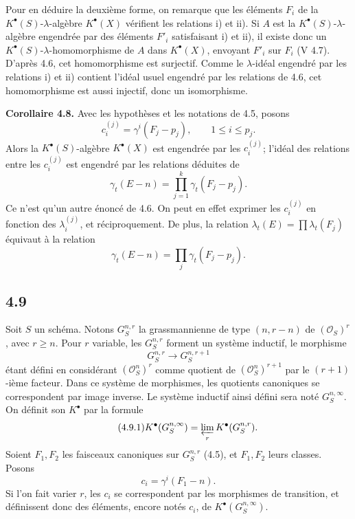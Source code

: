 \documentclass[11pt]{article}
\begin{document}
Pour en déduire la deuxième forme, on remarque que les éléments \(F_i\) de la \(K^\bullet(S)\)-\(\lambda\)-algèbre \(K^\bullet(X)\) vérifient les relations i) et ii). Si \(A\) est la \(K^\bullet(S)\)-\(\lambda\)-algèbre engendrée par des éléments \(F'_i\) satisfaisant i) et ii), il existe donc un \(K^\bullet(S)\)-\(\lambda\)-homomorphisme de \(A\) dans \(K^\bullet(X)\), envoyant \(F'_i\) sur \(F_i\) (V 4.7). D'après 4.6, cet homomorphisme est surjectif. Comme le \(\lambda\)-idéal engendré par les relations i) et ii) contient l'idéal usuel engendré par les relations de 4.6, cet homomorphisme est aussi injectif, donc un isomorphisme.

\textbf{Corollaire 4.8.} Avec les hypothèses et les notations de 4.5, posons
\[
  c_i^{(j)}=\gamma^i(F_j-p_j),\qquad 1\leq i\leq p_j.
\]
Alors la \(K^\bullet(S)\)-algèbre \(K^\bullet(X)\) est engendrée par les \(c_i^{(j)}\); l'idéal des relations entre les \(c_i^{(j)}\) est engendré par les relations déduites de
\[
  \gamma_t(E-n)=\prod_{j=1}^{k}\gamma_t(F_j-p_j).
\]
Ce n'est qu'un autre énoncé de 4.6. On peut en effet exprimer les \(c_i^{(j)}\) en fonction des \(\lambda_i^{(j)}\), et réciproquement. De plus, la relation \(\lambda_t(E)=\prod\lambda_t(F_j)\) équivaut à la relation
\[
  \gamma_t(E-n)=\prod_j\gamma_t(F_j-p_j).
\]

\subsection*{4.9}
Soit \(S\) un schéma. Notons \(G_S^{n,r}\) la grassmannienne de type \((n,r-n)\) de \((\mathcal O_S)^r\), avec \(r\geq n\). Pour \(r\) variable, les \(G_S^{n,r}\) forment un système inductif, le morphisme
\[
  G_S^{n,r}\longrightarrow G_S^{n,r+1}
\]
étant défini en considérant \((\mathcal O_S^n)^r\) comme quotient de \((\mathcal O_S^n)^{r+1}\) par le \((r+1)\)-ième facteur. Dans ce système de morphismes, les quotients canoniques se correspondent par image inverse. Le système inductif ainsi défini sera noté \(G_S^{n,\infty}\). On définit son \(K^\bullet\) par la formule
\begin{equation}\tag{4.9.1}
  K^\bullet(G_S^{n,\infty})=\varprojlim_r K^\bullet(G_S^{n,r}).
\end{equation}
Soient \(F_1,F_2\) les faisceaux canoniques sur \(G_S^{n,r}\) (4.5), et \(F_1,F_2\) leurs classes. Posons
\[
  c_i=\gamma^i(F_1-n).
\]
Si l'on fait varier \(r\), les \(c_i\) se correspondent par les morphismes de transition, et définissent donc des éléments, encore notés \(c_i\), de \(K^\bullet(G_S^{n,\infty})\).
\end{document}
